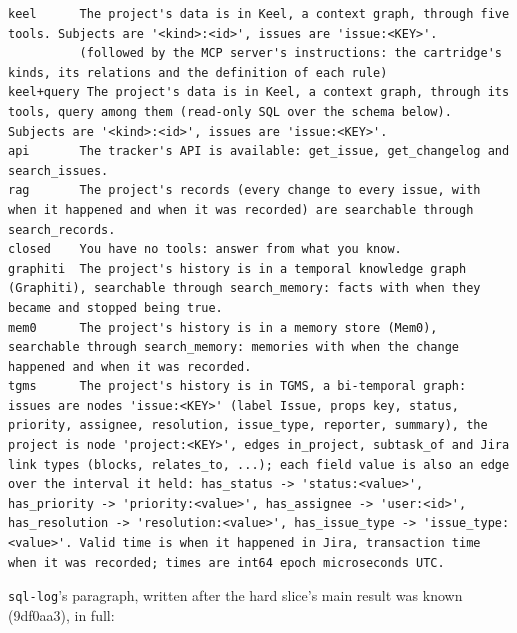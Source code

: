 \documentclass[sigconf, nonacm]{acmart}
\newcommand{\code}[1]{\texttt{#1}}
\begin{document}
\begin{lstlisting}
keel      The project's data is in Keel, a context graph, through five tools. Subjects are '<kind>:<id>', issues are 'issue:<KEY>'.
          (followed by the MCP server's instructions: the cartridge's kinds, its relations and the definition of each rule)
keel+query The project's data is in Keel, a context graph, through its tools, query among them (read-only SQL over the schema below). Subjects are '<kind>:<id>', issues are 'issue:<KEY>'.
api       The tracker's API is available: get_issue, get_changelog and search_issues.
rag       The project's records (every change to every issue, with when it happened and when it was recorded) are searchable through search_records.
closed    You have no tools: answer from what you know.
graphiti  The project's history is in a temporal knowledge graph (Graphiti), searchable through search_memory: facts with when they became and stopped being true.
mem0      The project's history is in a memory store (Mem0), searchable through search_memory: memories with when the change happened and when it was recorded.
tgms      The project's history is in TGMS, a bi-temporal graph: issues are nodes 'issue:<KEY>' (label Issue, props key, status, priority, assignee, resolution, issue_type, reporter, summary), the project is node 'project:<KEY>', edges in_project, subtask_of and Jira link types (blocks, relates_to, ...); each field value is also an edge over the interval it held: has_status -> 'status:<value>', has_priority -> 'priority:<value>', has_assignee -> 'user:<id>', has_resolution -> 'resolution:<value>', has_issue_type -> 'issue_type:<value>'. Valid time is when it happened in Jira, transaction time when it was recorded; times are int64 epoch microseconds UTC.
\end{lstlisting}

\code{sql-log}'s paragraph, written after the hard slice's main result was known (9df0aa3), in full:
\end{document}
